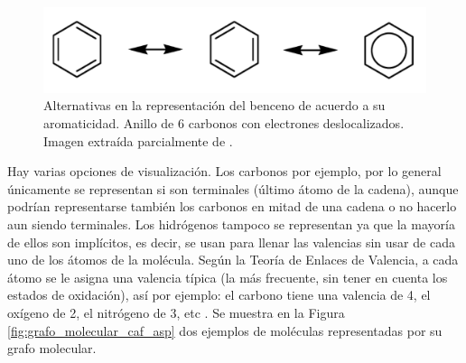 \begin{figure}[h!]
    \centering
    \includegraphics[scale=0.35]{imagenes/estado_arte/teoria/benceno.png}
    \caption{Alternativas en la representación del benceno de acuerdo a su aromaticidad. Anillo de 6 carbonos con electrones deslocalizados. Imagen extraída parcialmente de \cite{iupac_manual}.}
    \label{fig:aromatico_benceno}
\end{figure}

Hay varias opciones de visualización. Los carbonos por ejemplo, por lo general únicamente se representan si son terminales (último átomo de la cadena), aunque podrían representarse también los carbonos en mitad de una cadena o no hacerlo aun siendo terminales. Los hidrógenos tampoco se representan ya que la mayoría de ellos son implícitos, es decir, se usan para llenar las valencias sin usar de cada uno de los átomos de la molécula. Según la Teoría de Enlaces de Valencia, a cada átomo se le asigna una valencia típica (la más frecuente, sin tener en cuenta los estados de oxidación), así por ejemplo: el carbono tiene una valencia de 4, el oxígeno de 2, el nitrógeno de 3, etc \cite{vbt, brown_chemoinformaticsintroduction_2009}. Se muestra en la Figura \ref{fig:grafo_molecular_caf_asp} dos ejemplos de moléculas representadas por su grafo molecular.

